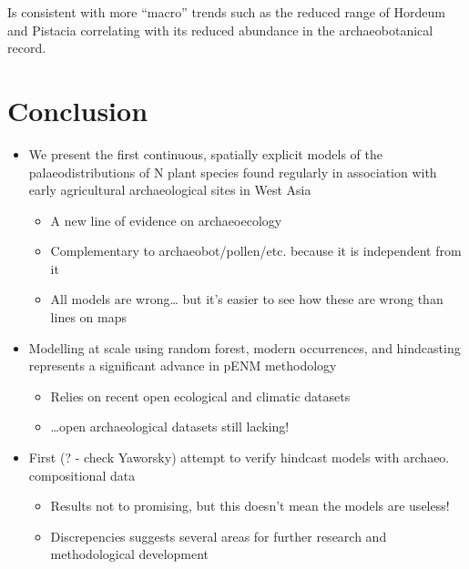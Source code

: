 \documentclass[
  authoryear,
  preprint]{elsarticle}
\providecommand{\tightlist}{%
  \setlength{\itemsep}{0pt}\setlength{\parskip}{0pt}}\usepackage{longtable,booktabs,array}
\begin{document}
Is consistent with more ``macro'' trends such as the reduced range of
Hordeum and Pistacia correlating with its reduced abundance in the
archaeobotanical record.

\section{Conclusion}\label{conclusion}

\begin{itemize}
\tightlist
\item
  We present the first continuous, spatially explicit models of the
  palaeodistributions of N plant species found regularly in association
  with early agricultural archaeological sites in West Asia

  \begin{itemize}
  \tightlist
  \item
    A new line of evidence on archaeoecology
  \item
    Complementary to archaeobot/pollen/etc. because it is independent
    from it
  \item
    All models are wrong\ldots{} but it's easier to see how these are
    wrong than lines on maps
  \end{itemize}
\item
  Modelling at scale using random forest, modern occurrences, and
  hindcasting represents a significant advance in pENM methodology

  \begin{itemize}
  \tightlist
  \item
    Relies on recent open ecological and climatic datasets
  \item
    \ldots open archaeological datasets still lacking!
  \end{itemize}
\item
  First (? - check Yaworsky) attempt to verify hindcast models with
  archaeo. compositional data

  \begin{itemize}
  \tightlist
  \item
    Results not to promising, but this doesn't mean the models are
    useless!
  \item
    Discrepencies suggests several areas for further research and
    methodological development
  \end{itemize}
\end{itemize}


\renewcommand\refname{References}
  
\end{document}
